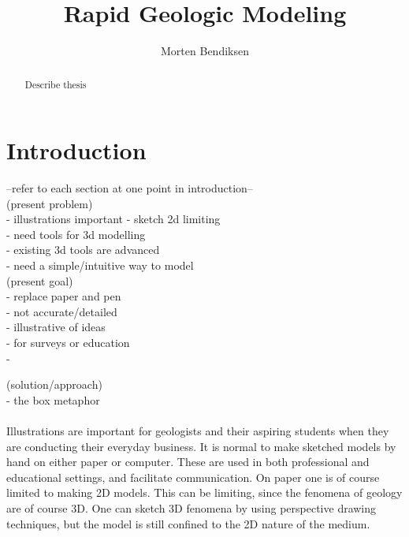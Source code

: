 \documentclass[a4paper,10pt]{article}
\title{Rapid Geologic Modeling}
\author{Morten Bendiksen}
\begin{document}
\maketitle

\begin{abstract}
Describe thesis
\end{abstract}

\newpage

\tableofcontents 

\newpage


\section{Introduction}


--refer to each section at one point in introduction--\\

(present problem)\\
	- illustrations important
	- sketch 2d limiting\\
	- need tools for 3d modelling\\
	- existing 3d tools are advanced\\
	- need a simple/intuitive way to model\\
	
(present goal)\\
	- replace paper and pen\\
	- not accurate/detailed\\
	- illustrative of ideas\\
	- for surveys or education\\
	- 
	
(solution/approach)\\
	- the box metaphor\\\\
	
	
Illustrations are important for geologists and their aspiring students when they are conducting their everyday business. It is normal to make sketched models by hand on either paper or computer. These are used in both professional and educational settings, and facilitate communication. On paper one is of course limited to making 2D models. This can be limiting, since the fenomena of geology are of course 3D. One can sketch 3D fenomena by using perspective drawing techniques, but the model is still confined to the 2D nature of the medium.
\end{document}
